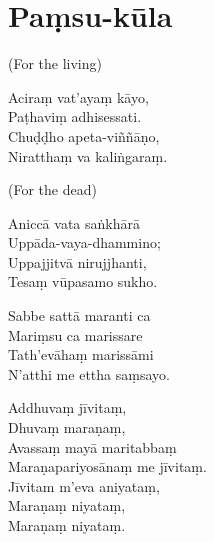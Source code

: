 \chapter{Paṃsu-kūla}

(For the living)

Aciraṃ vat’ayaṃ kāyo,\\
Paṭhaviṃ adhisessati.\\
Chuḍḍho apeta-viññāṇo,\\
Niratthaṃ va kaliṅgaraṃ.

(For the dead)

Aniccā vata saṅkhārā\\
Uppāda-vaya-dhammino;\\
Uppajjitvā nirujjhanti,\\
Tesaṃ vūpasamo sukho.

Sabbe sattā maranti ca\\
Mariṃsu ca marissare\\
Tath’evāhaṃ marissāmi\\
N’atthi me ettha saṃsayo.

Addhuvaṃ jīvitaṃ,\\
Dhuvaṃ maraṇaṃ,\\
Avassaṃ mayā maritabbaṃ\\
Maraṇapariyosānaṃ me jīvitaṃ.\\
Jīvitam m’eva aniyataṃ,\\
Maraṇaṃ niyataṃ,\\
Maraṇaṃ niyataṃ.


